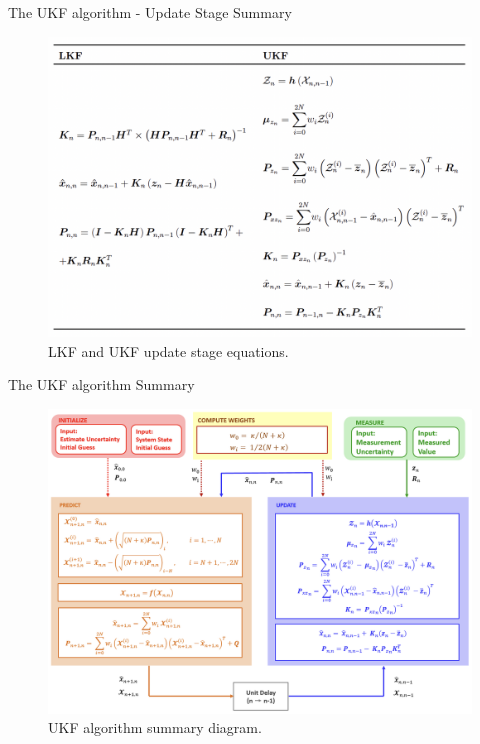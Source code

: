 \begin{frame}{The UKF algorithm - Update Stage Summary}
\begin{figure}
    \centering
    \includegraphics[width=0.9\linewidth]{Figures//Part3/UKF_UpdateSummary.png}
    \vspace{-12pt}
    \caption{LKF and UKF update stage equations.}
\end{figure}
\end{frame}

\begin{frame}{The UKF algorithm Summary}
\begin{figure}
    \centering
    \includegraphics[width=0.85\linewidth]{Figures//Part3/UKFAlgorithmSummary.png}
    \caption{UKF algorithm summary diagram.}
\end{figure}
\end{frame}

